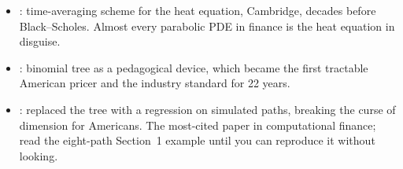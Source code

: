 \begin{historybox}[title={Three papers that run derivatives desks}]
\begin{itemize}
  \item \citet{cranknicolson1947}: time-averaging scheme for the heat
    equation, Cambridge, decades before Black--Scholes.  Almost every
    parabolic PDE in finance is the heat equation in disguise.
  \item \citet{coxrossrubinstein1979}: binomial tree as a pedagogical
    device, which became the first tractable American pricer and the
    industry standard for 22 years.
  \item \citet{longstaffschwartz2001}: replaced the tree with a
    regression on simulated paths, breaking the curse of dimension
    for Americans.  The most-cited paper in computational finance;
    read the eight-path Section~1 example until you can reproduce it
    without looking.
\end{itemize}
\end{historybox}
